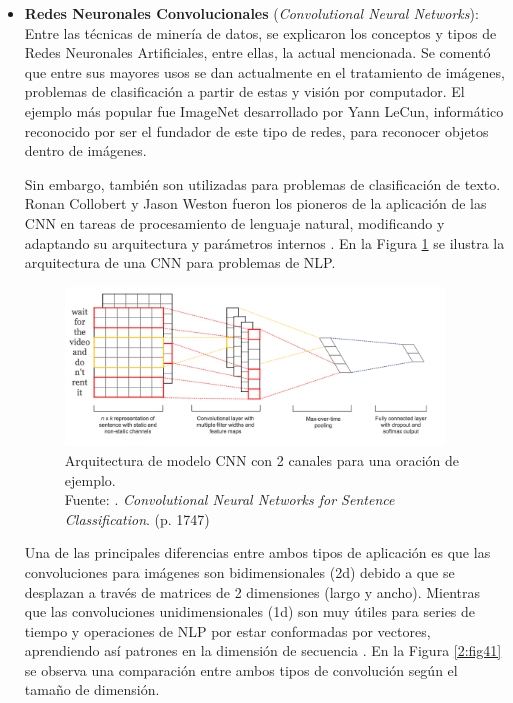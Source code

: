 \begin{itemize}
	\item \textbf{Redes Neuronales Convolucionales} (\textit{Convolutional Neural Networks}): Entre las técnicas de minería de datos, se explicaron los conceptos y tipos de Redes Neuronales Artificiales, entre ellas, la actual mencionada. Se comentó que entre sus mayores usos se dan actualmente en el tratamiento de imágenes, problemas de clasificación a partir de estas y visión por computador. El ejemplo más popular fue ImageNet desarrollado por Yann LeCun, informático reconocido por ser el fundador de este tipo de redes, para reconocer objetos dentro de imágenes.
	
	Sin embargo, también son utilizadas para problemas de clasificación de texto. Ronan Collobert y Jason Weston fueron los pioneros de la aplicación de las CNN en tareas de procesamiento de lenguaje natural, modificando y adaptando su arquitectura y parámetros internos \parencite{bk_kamath2019deeplearning_nlp_sr}. En la Figura \ref{2:fig40} se ilustra la arquitectura de una CNN para problemas de NLP.
	\begin{figure}[!ht]
		\begin{center}
			\includegraphics[width=0.95\textwidth]{2/figures/cnn_nlp.png}
			\caption[Arquitectura de modelo CNN con 2 canales para una oración de ejemplo]{Arquitectura de modelo CNN con 2 canales para una oración de ejemplo.\\
			Fuente: \cite{tec_kim2014convolutional}. \textit{Convolutional Neural Networks for Sentence Classification}. (p. 1747)}
			\label{2:fig40}
		\end{center}
	\end{figure}
	
	Una de las principales diferencias entre ambos tipos de aplicación es que las convoluciones para imágenes son bidimensionales (2d) debido a que se desplazan a través de matrices de 2 dimensiones (largo y ancho). Mientras que las convoluciones unidimensionales (1d) son muy útiles para series de tiempo y operaciones de NLP por estar conformadas por vectores, aprendiendo así patrones en la dimensión de secuencia \parencite{bk_rao2019nlp_pytorch}. En la Figura \ref{2:fig41} se observa una comparación entre ambos tipos de convolución según el tamaño de dimensión.


\end{itemize}
